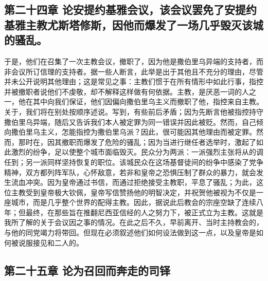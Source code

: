 \subsection{第二十四章 论安提约基雅会议，该会议罢免了安提约基雅主教尤斯塔修斯，因他而爆发了一场几乎毁灭该城的骚乱。}

于是，他们在召集了一次主教会议，撤职了，因为他是撒伯里乌异端的支持者，而非会议所订信理的支持者。据一些人断言，此举是出于其他且不充分的理由，尽管并未公开说明其他理由；这是常见之事：主教们惯于在所有情形中如此行事，指控并被撤职者说他们不虔敬，却不解释这样做有何依据。主教，是厌恶一词的人之一，他在其中向我们保证，他们因偏向撒伯里乌主义而撤职了他，指控来自主教。关于，我们将在别处按顺序述说。写到，有些前后矛盾；因为先断言他被指控持守撒伯里乌异端，随后又告诉我们本人被定罪为同一错误并因此被贬。然而，自己倾向撒伯里乌主义，怎能指控为撒伯里乌派？因此，很可能因其他理由而被定罪。然而，那时在，因其撤职而爆发了危险的骚乱；因为当进行继任者选举时，激起了如此激烈的纷争，足以使整个城市面临毁灭。民众分为两派：一派强烈主张将从的调任到；另一派同样坚持恢复的职位。该城民众在这场基督徒间的纷争中感染了党争精神，双方都列阵军队，心怀敌意，若非和皇帝之恐惧压制了群众的暴力，就会发生流血冲突。因为皇帝通过书信，而通过拒绝接受主教职，平息了骚乱；为此，这位主教受到皇帝极大钦佩，皇帝写信赞扬他的明智决定，并祝贺他被视为不仅是一座城市，而是几乎整个世界的配得主教。因此，据说此后教会的宗座空缺了连续八年；但最终，在那些旨在推翻尼西亚信经的人之努力下，被正式立为主教。这就是我所了解的关于会议因之事的情况。在此之后不久，早前离开、当时主持教会的，与他的同党竭力将带回。但现在必须叙述他们如何设法做到这一点，以及皇帝是如何被说服接见和二人的。\par


\subsection{第二十五章 论为召回而奔走的司铎}

